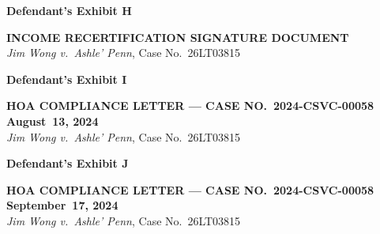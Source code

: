 \documentclass[10pt,letterpaper,oneside]{extarticle}
\begin{document}
\newpage
{}
\begin{flushleft}
	\textbf{\large Defendant's Exhibit H}
\end{flushleft}
\begin{center}
	\textbf{INCOME RECERTIFICATION SIGNATURE
		DOCUMENT}\\[4pt]
	\textit{Jim Wong v.\ Ashle' Penn},
	Case No.\ 26LT03815
\end{center}
\vspace{0.5em}

\newpage
{}
\begin{flushleft}
	\textbf{\large Defendant's Exhibit I}
\end{flushleft}
\begin{center}
	\textbf{HOA COMPLIANCE LETTER ---
		CASE NO.\ 2024-CSVC-00058}\\[2pt]
	\textbf{August~13, 2024}\\[4pt]
	\textit{Jim Wong v.\ Ashle' Penn},
	Case No.\ 26LT03815
\end{center}
\vspace{0.5em}

\newpage
{}
\begin{flushleft}
	\textbf{\large Defendant's Exhibit J}
\end{flushleft}
\begin{center}
	\textbf{HOA COMPLIANCE LETTER ---
		CASE NO.\ 2024-CSVC-00058}\\[2pt]
	\textbf{September~17, 2024}\\[4pt]
	\textit{Jim Wong v.\ Ashle' Penn},
	Case No.\ 26LT03815
\end{center}
\vspace{0.5em}

\end{document}
